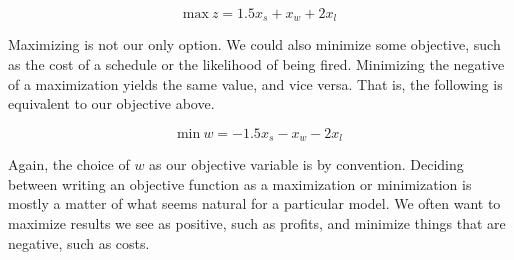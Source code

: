 $$\text{max}\ z = 1.5 x_s + x_w + 2 x_l$$


Maximizing is not our only option. We could also minimize some objective, such as the cost of a schedule or the likelihood of being fired. Minimizing the negative of a maximization yields the same value, and vice versa. That is, the following is equivalent to our objective above.

$$\text{min}\ w = -1.5 x_s - x_w - 2 x_l$$

Again, the choice of $w$ as our objective variable is by convention. Deciding between writing an objective function as a maximization or minimization is mostly a matter of what seems natural for a particular model. We often want to maximize results we see as positive, such as profits, and minimize things that are negative, such as costs.
